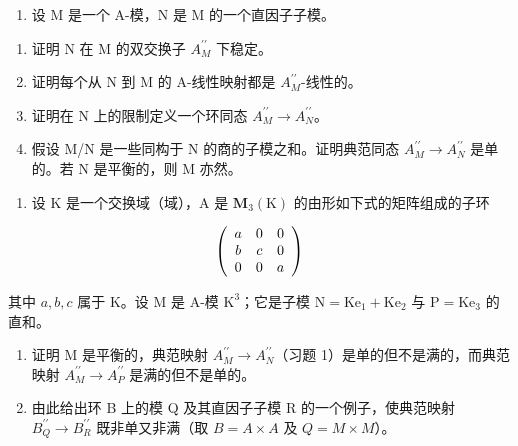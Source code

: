 
\begin{enumerate}
\def\labelenumi{\arabic{enumi})}
\tightlist
\item
  设 M 是一个 A-模，N 是 M 的一个直因子子模。
\end{enumerate}

\begin{enumerate}
\def\labelenumi{\alph{enumi})}
\item
  证明 N 在 M 的双交换子 \(A_{M}^{\prime\prime}\) 下稳定。
\item
  证明每个从 N 到 M 的 A-线性映射都是 \(A_{M}^{\prime\prime}\)-线性的。
\item
  证明在 N 上的限制定义一个环同态 \(A_{M}^{\prime\prime} \to A_{N}^{\prime\prime}\)。
\item
  假设 M/N 是一些同构于 N 的商的子模之和。证明典范同态 \(A_{M}^{\prime\prime} \rightarrow A_{N}^{\prime\prime}\) 是单的。若 N 是平衡的，则 M 亦然。
\end{enumerate}

\begin{enumerate}
\def\labelenumi{\arabic{enumi})}
\setcounter{enumi}{1}
\tightlist
\item
  设 K 是一个交换域（域），A 是 \(\mathbf{M}_{3}(\mathrm{K})\) 的由形如下式的矩阵组成的子环
\end{enumerate}

\[
\left( \begin{array}{c c c} a & 0 & 0 \\ b & c & 0 \\ 0 & 0 & a \end{array} \right)
\]

其中 \(a, b, c\) 属于 K。设 M 是 A-模 \(\mathrm{K}^3\)；它是子模 \(\mathrm{N} = \mathrm{Ke}_1 + \mathrm{Ke}_2\) 与 \(\mathrm{P} = \mathrm{Ke}_3\) 的直和。

\begin{enumerate}
\def\labelenumi{\alph{enumi})}
\item
  证明 M 是平衡的，典范映射 \(A_{M}^{\prime\prime} \rightarrow A_{N}^{\prime\prime}\)（习题 1）是单的但不是满的，而典范映射 \(A_{M}^{\prime\prime} \rightarrow A_{P}^{\prime\prime}\) 是满的但不是单的。
\item
  由此给出环 B 上的模 Q 及其直因子子模 R 的一个例子，使典范映射 \(B_{Q}^{\prime\prime} \rightarrow B_{R}^{\prime\prime}\) 既非单又非满（取 \(B = A \times A\) 及 \(Q = M \times M\)）。
\end{enumerate}

